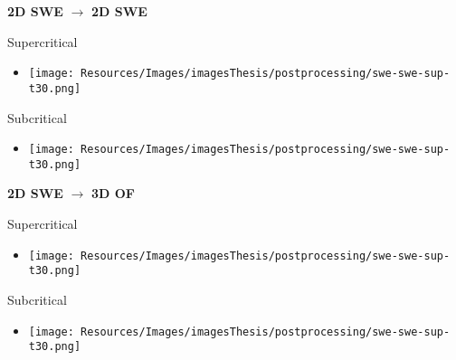 \begin{frame}
\large \textbf{2D SWE} $ \rightarrow$ \textbf{2D SWE}\\[1.0cm]
\begin{minipage}{0.45\textwidth}
\centering
Supercritical
\begin{itemize}
\item<2->[]
\texttt{[image: Resources/Images/imagesThesis/postprocessing/swe-swe-sup-t30.png]}
\end{itemize}
\end{minipage}
\begin{minipage}{0.45\textwidth}
\centering
Subcritical\\
\begin{itemize}
\item<3->[]
\centering
\texttt{[image: Resources/Images/imagesThesis/postprocessing/swe-swe-sup-t30.png]}
\end{itemize}
\end{minipage}
\end{frame}

\begin{frame}
\large \textbf{2D SWE} $ \rightarrow$ \textbf{3D OF}\\[1.0cm]
\begin{minipage}{0.45\textwidth}
\centering
Supercritical
\begin{itemize}
\item<2->[]
\texttt{[image: Resources/Images/imagesThesis/postprocessing/swe-swe-sup-t30.png]}
\end{itemize}
\end{minipage}
\begin{minipage}{0.45\textwidth}
\centering
Subcritical\\
\begin{itemize}
\item<3->[]
\centering
\texttt{[image: Resources/Images/imagesThesis/postprocessing/swe-swe-sup-t30.png]}
\end{itemize}
\end{minipage}
\end{frame}


